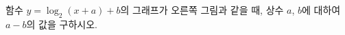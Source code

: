 \noindent\begin{minipage}[t]{0.58\linewidth}\vspace{0pt}\raggedright 함수 $y=\log_2 (x+a)+b$의 그래프가 오른쪽 그림과 같을 때, 상수 $a$, $b$에 대하여 $a-b$의 값을 구하시오.\end{minipage}\hfill\begin{minipage}[t]{0.4\linewidth}\vspace{0pt}\centering \resizebox{\ifdim\width>\linewidth\linewidth\else\width\fi}{!}{}\end{minipage}\par
